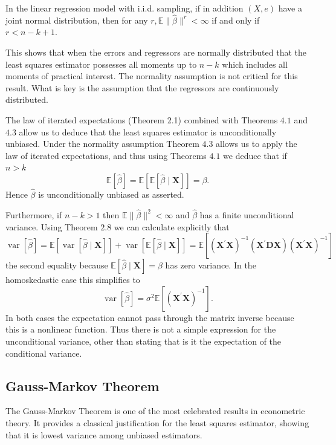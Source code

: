 \documentclass[10pt]{article}
\begin{document}
In the linear regression model with i.i.d. sampling, if in addition $(X, e)$ have a joint normal distribution, then for any $r, \mathbb{E}\|\widehat{\beta}\|^{r}<\infty$ if and only if $r<n-k+1$.

This shows that when the errors and regressors are normally distributed that the least squares estimator possesses all moments up to $n-k$ which includes all moments of practical interest. The normality assumption is not critical for this result. What is key is the assumption that the regressors are continuously distributed.

The law of iterated expectations (Theorem 2.1) combined with Theorems $4.1$ and $4.3$ allow us to deduce that the least squares estimator is unconditionally unbiased. Under the normality assumption Theorem $4.3$ allows us to apply the law of iterated expectations, and thus using Theorems $4.1$ we deduce that if $n>k$
$$
\mathbb{E}[\widehat{\beta}]=\mathbb{E}[\mathbb{E}[\widehat{\beta} \mid \boldsymbol{X}]]=\beta .
$$
Hence $\widehat{\beta}$ is unconditionally unbiased as asserted.

Furthermore, if $n-k>1$ then $\mathbb{E}\|\widehat{\beta}\|^{2}<\infty$ and $\widehat{\beta}$ has a finite unconditional variance. Using Theorem $2.8$ we can calculate explicitly that
$$
\operatorname{var}[\widehat{\beta}]=\mathbb{E}[\operatorname{var}[\widehat{\beta} \mid \boldsymbol{X}]]+\operatorname{var}[\mathbb{E}[\widehat{\beta} \mid \boldsymbol{X}]]=\mathbb{E}\left[\left(\boldsymbol{X}^{\prime} \boldsymbol{X}\right)^{-1}\left(\boldsymbol{X}^{\prime} \boldsymbol{D} \boldsymbol{X}\right)\left(\boldsymbol{X}^{\prime} \boldsymbol{X}\right)^{-1}\right]
$$
the second equality because $\mathbb{E}[\widehat{\beta} \mid \boldsymbol{X}]=\beta$ has zero variance. In the homoskedastic case this simplifies to
$$
\operatorname{var}[\widehat{\beta}]=\sigma^{2} \mathbb{E}\left[\left(\boldsymbol{X}^{\prime} \boldsymbol{X}\right)^{-1}\right] .
$$
In both cases the expectation cannot pass through the matrix inverse because this is a nonlinear function. Thus there is not a simple expression for the unconditional variance, other than stating that is it the expectation of the conditional variance.

\subsection{Gauss-Markov Theorem}
The Gauss-Markov Theorem is one of the most celebrated results in econometric theory. It provides a classical justification for the least squares estimator, showing that it is lowest variance among unbiased estimators.
\end{document}
